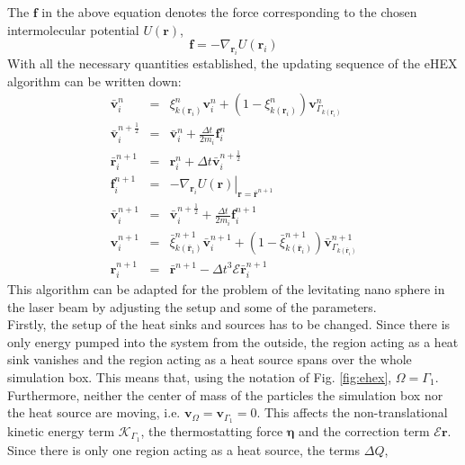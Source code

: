 \documentclass[12pt]{article}
\begin{document}
The $\mathbf{f}$ in the above equation denotes the force corresponding to the chosen intermolecular potential $U(\mathbf{r})$, 
\begin{equation}
    \mathbf{f} = -\nabla_{\mathbf{r}_i} U(\mathbf{r}_i)
\end{equation}
With all the necessary quantities established, the updating sequence of the eHEX algorithm can be written down:
\begin{subequations}
\begin{eqnarray}
    \bar{\mathbf{v}}^n_i &=& \xi^n_{k(\mathbf{r}_i)} \mathbf{v}^n_i + \left(1-\xi^n_{k(\mathbf{r}_i)}\right) \mathbf{v}^n_{\Gamma_{k(\mathbf{r}_i)}} \\
    \bar{\mathbf{v}}^{n+\frac12}_i &=& \bar{\mathbf{v}}^n_i + \frac{\Delta t}{2m_i} \mathbf{f}^n_i\\
    \bar{\mathbf{r}}^{n+1}_i &=& \mathbf{r}^n_i + \Delta t \bar{\mathbf{v}}^{n+\frac12}_i\\
    \mathbf{f}^{n+1}_i &=& \left.-\nabla_{\mathbf{r}_i} U(\mathbf{r})\right|_{\mathbf{r} = \bar{\mathbf{r}}^{n+1}}\\
    \bar{\mathbf{v}}^{n+1}_i &=& \bar{\mathbf{v}}^{n+\frac12}_i + \frac{\Delta t}{2m_i} \mathbf{f}^{n+1}_i\\
    \mathbf{v}^{n+1}_i &=& \bar{\xi}^{n+1}_{k(\bar{\mathbf{r}}_i)} \bar{\mathbf{v}}^{n+1}_i + \left(1-\bar{\xi}^{n+1}_{k(\bar{\mathbf{r}}_i)}\right)
    \bar{\mathbf{v}}^{n+1}_{\Gamma_{k(\bar{\mathbf{r}}_i)}} \\
    \mathbf{r}^{n+1}_i &=& \bar{\mathbf{r}}^{n+1} - \Delta t^3 \mathcal{E}\bar{\mathbf{r}}^{n+1}_i
\end{eqnarray}
\end{subequations}
This algorithm can be adapted for the problem of the levitating nano sphere in the laser beam by adjusting the setup and some of the parameters.\\
Firstly, the setup of the heat sinks and sources has to be changed. Since there is only energy pumped into the system from the outside, the region
acting as a heat sink vanishes and the region acting as a heat source spans over the whole simulation box. This means that, using the 
notation of Fig. \ref{fig:ehex}, $\Omega = \Gamma_1$. Furthermore, neither the center of mass of the particles the simulation box nor 
the heat source are moving, i.e. 
$\mathbf{v}_\Omega = \mathbf{v}_{\Gamma_1} = 0$. This affects the non-translational kinetic energy term $\mathcal{K}_{\Gamma_1}$, the thermostatting
force $\boldsymbol{\eta}$ and the correction term $\mathcal{E}\mathbf{r}$. Since there is only one region acting as a heat source, the terms $\Delta Q$,
\end{document}
